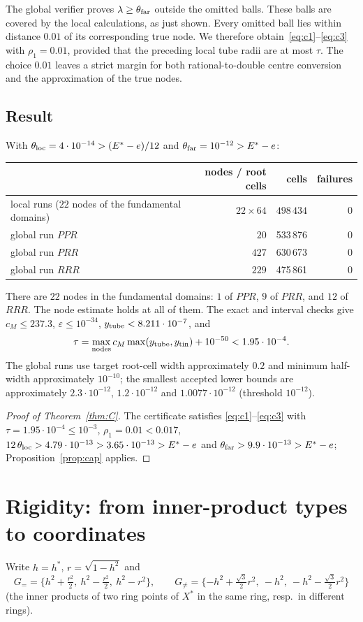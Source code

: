 \documentclass[11pt]{article}
\theoremstyle{definition}
\newcommand{\Xs}{X^{\ast}}
\newcommand{\Es}{E^{\ast}}
\newcommand{\hs}{h^{\ast}}
\newcommand{\TUBE}{1.95\cdot10^{-4}}        %
\newcommand{\THLOC}{4\cdot10^{-14}}
\newcommand{\THFAR}{10^{-12}}
\newcommand{\CMAX}{237.3}          %
\newcommand{\NPPR}{533\,876}\newcommand{\NPRR}{630\,673}\newcommand{\NRRR}{475\,861}
\begin{document}
The global verifier proves $\lambda\ge\theta_{\rm far}$ outside the omitted balls. These balls are covered by the local
calculations, as just shown. Every omitted ball lies within distance $0.01$ of its corresponding true node.
We therefore obtain~\eqref{eq:c1}--\eqref{eq:c3} with $\rho_1=0.01$, provided that the preceding local tube radii are
at most $\tau$. The choice $0.01$ leaves a strict margin for both rational-to-double centre conversion and the
approximation of the true nodes.

\subsection{Result}
With $\theta_{\rm loc}=\THLOC>(\Es-e)/12$ and $\theta_{\rm far}=\THFAR>\Es-e$:
\begin{center}
\begin{tabular}{lrrr}
\toprule
 & nodes / root cells & cells & failures\\
\midrule
local runs ($22$ nodes of the fundamental domains) & $22\times64$ & $498\,434$ & $0$\\
global run $PPR$ & $20$ & \NPPR & $0$\\
global run $PRR$ & $427$ & \NPRR & $0$\\
global run $RRR$ & $229$ & \NRRR & $0$\\
\bottomrule
\end{tabular}
\end{center}
There are $22$ nodes in the fundamental domains: $1$ of $PPR$, $9$ of $PRR$, and $12$ of $RRR$.
The node estimate holds at all of them. The exact and interval checks give
$c_M\le\CMAX$, $\varepsilon\le10^{-34}$, $y_{\rm tube}<8.211\cdot10^{-7}$, and
\[
 \tau=\max_{\rm nodes}c_M\max(y_{\rm tube},y_{\rm tin})+10^{-50}<\TUBE .
\]
The global runs use target root-cell width approximately $0.2$ and minimum half-width approximately $10^{-10}$;
the smallest accepted lower bounds are approximately
$2.3\cdot10^{-12}$, $1.2\cdot10^{-12}$ and $1.0077\cdot10^{-12}$ (threshold $10^{-12}$).
\begin{proof}[Proof of Theorem~\ref{thm:C}]
The certificate satisfies \eqref{eq:c1}--\eqref{eq:c3} with $\tau=\TUBE\le10^{-3}$, $\rho_1=0.01<0.017$,
$12\,\theta_{\rm loc}>4.79\cdot10^{-13}>3.65\cdot10^{-13}>\Es-e$ and $\theta_{\rm far}>9.9\cdot10^{-13}>\Es-e$;
Proposition~\ref{prop:cap} applies.
\end{proof}

\section{Rigidity: from inner-product types to coordinates}\label{sec:rigidity}
Write $h=\hs$, $r=\sqrt{1-h^2}$ and
\[
 G_{=}=\{h^2+\tfrac{r^2}{2},\ h^2-\tfrac{r^2}{2},\ h^2-r^2\},\qquad
 G_{\neq}=\{-h^2+\tfrac{\sqrt3}{2}r^2,\ -h^2,\ -h^2-\tfrac{\sqrt3}{2}r^2\}
\]
(the inner products of two ring points of $\Xs$ in the same ring, resp.\ in different rings).
\end{document}
